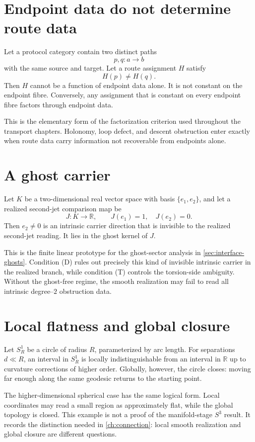 \section{Endpoint data do not determine route data}
\label{app:example-route-fibre}
Let a protocol category contain two distinct paths
\[
	p,q:a\to b
\]
with the same source and target.  Let a route assignment \(H\) satisfy
\[
	H(p)\ne H(q).
\]
Then \(H\) cannot be a function of endpoint data alone.  It is not
constant on the endpoint fibre.  Conversely, any assignment that is
constant on every endpoint fibre factors through endpoint data.

This is the elementary form of the factorization criterion used
throughout the transport chapters.  Holonomy, loop defect, and
descent obstruction enter exactly when route data carry information not
recoverable from endpoints alone.

\section{A ghost carrier}
\label{app:example-ghost-carrier}
Let \(K\) be a two-dimensional real vector space with basis
\(\{e_1,e_2\}\), and let a realized second-jet comparison map be
\[
	J:K\to\mathbb R,
	\qquad
	J(e_1)=1,\quad J(e_2)=0.
\]
Then \(e_2\ne 0\) is an intrinsic carrier direction that is invisible to
the realized second-jet reading.  It lies in the ghost kernel of \(J\).

This is the finite linear prototype for the ghost-sector analysis in
\cref{sec:interface-ghosts}.  Condition \textup{(D)} rules out precisely
this kind of invisible intrinsic carrier in the realized branch, while
condition \textup{(T)} controls the torsion-side ambiguity.  Without the
ghost-free regime, the smooth realization may fail to read all
intrinsic degree--\(2\) obstruction data.

\section{Local flatness and global closure}
\label{app:example-local-flat-global-closed}
Let \(S^1_R\) be a circle of radius \(R\), parameterized by arc length.
For separations \(d\ll R\), an interval in \(S^1_R\) is locally
indistinguishable from an interval in \(\mathbb R\) up to curvature
corrections of higher order.  Globally, however, the circle closes:
moving far enough along the same geodesic returns to the starting
point.

The higher-dimensional spherical case has the same logical form.  Local
coordinates may read a small region as approximately flat, while the
global topology is closed.  This example is not a proof of the
manifold-stage \(S^3\) result.  It records the distinction needed in
\cref{ch:connection}: local smooth realization and global closure are
different questions.


